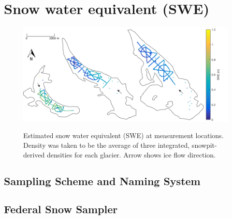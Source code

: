 \documentclass[12pt]{article}
\begin{document}
\section{Snow water equivalent (SWE)}

\begin{landscape}
\begin{figure}
	\centering
	\includegraphics[width = 23 cm]{SWEmap.png}\\
	\caption{Estimated snow water equivalent (SWE) at measurement locations. Density was taken to be the average of three integrated, snowpit-derived densities for each glacier. Arrow shows ice flow direction.}
	\label{studysites}
\end{figure}

\end{landscape}

\subsection{Sampling Scheme and Naming System}






 \subsection{Federal Snow Sampler}
\label{sec:SWE}
 
\end{document}
